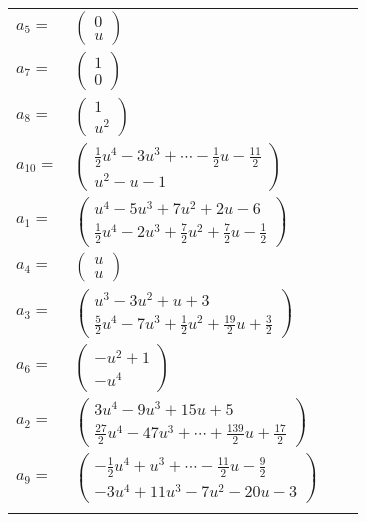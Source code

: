 \documentclass[1p]{elsarticle_modified}
\theoremstyle{definition}
\begin{document}
\begin{tabular}{m{7pt} m{180pt} m{7pt} m{180pt} }
\flushright $a_{5}=$&$\begin{pmatrix}0\\u\end{pmatrix}$ \\
\flushright $a_{7}=$&$\begin{pmatrix}1\\0\end{pmatrix}$ \\
\flushright $a_{8}=$&$\begin{pmatrix}1\\u^2\end{pmatrix}$ \\
\flushright $a_{10}=$&$\begin{pmatrix}\frac{1}{2} u^4-3 u^3+\cdots-\frac{1}{2} u-\frac{11}{2}\\u^2- u-1\end{pmatrix}$ \\
\flushright $a_{1}=$&$\begin{pmatrix}u^4-5 u^3+7 u^2+2 u-6\\\frac{1}{2} u^4-2 u^3+\frac{7}{2} u^2+\frac{7}{2} u-\frac{1}{2}\end{pmatrix}$ \\
\flushright $a_{4}=$&$\begin{pmatrix}u\\u\end{pmatrix}$ \\
\flushright $a_{3}=$&$\begin{pmatrix}u^3-3 u^2+u+3\\\frac{5}{2} u^4-7 u^3+\frac{1}{2} u^2+\frac{19}{2} u+\frac{3}{2}\end{pmatrix}$ \\
\flushright $a_{6}=$&$\begin{pmatrix}- u^2+1\\- u^4\end{pmatrix}$ \\
\flushright $a_{2}=$&$\begin{pmatrix}3 u^4-9 u^3+15 u+5\\\frac{27}{2} u^4-47 u^3+\cdots+\frac{139}{2} u+\frac{17}{2}\end{pmatrix}$ \\
\flushright $a_{9}=$&$\begin{pmatrix}-\frac{1}{2} u^4+u^3+\cdots-\frac{11}{2} u-\frac{9}{2}\\-3 u^4+11 u^3-7 u^2-20 u-3\end{pmatrix}$\\&\end{tabular}
\end{document}
